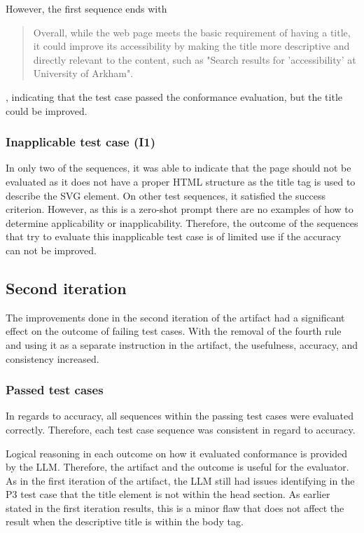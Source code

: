 However, the first sequence ends with \blockquote{Overall, while the web page meets the basic requirement of having a title, it could improve its accessibility by making the title more descriptive and directly relevant to the content, such as "Search results for 'accessibility' at University of Arkham".}, indicating that the test case passed the conformance evaluation, but the title could be improved.

\subsubsection{Inapplicable test case (I1)}

In only two of the sequences, it was able to indicate that the page should not be evaluated as it does not have a proper HTML structure as the title tag is used to describe the SVG element. On other test sequences, it satisfied the success criterion. However, as this is a zero-shot prompt there are no examples of how to determine applicability or inapplicability. Therefore, the outcome of the sequences that try to evaluate this inapplicable test case is of limited use if the accuracy can not be improved.

\subsection{Second iteration}

The improvements done in the second iteration of the artifact had a significant effect on the outcome of failing test cases. With the removal of the fourth rule and using it as a separate instruction in the artifact, the usefulness, accuracy, and consistency increased.

\subsubsection{Passed test cases}

In regards to accuracy, all sequences within the passing test cases were evaluated correctly. Therefore, each test case sequence was consistent in regard to accuracy.

Logical reasoning in each outcome on how it evaluated conformance is provided by the LLM. Therefore, the artifact and the outcome is useful for the evaluator. As in the first iteration of the artifact, the LLM still had issues identifying in the P3 test case that the title element is not within the head section. As earlier stated in the first iteration results, this is a minor flaw that does not affect the result when the descriptive title is within the body tag.


